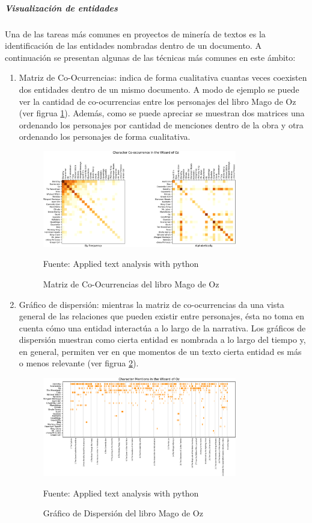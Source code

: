 \subparagraph{Visualización  de entidades}
\subparagraph*{}
    Una de las tareas más comunes en proyectos de minería de textos es la identificación de las entidades nombradas dentro de un documento. A continuación se presentan algunas de las técnicas más comunes en este ámbito:
\begin{enumerate}
    \item Matriz de Co-Ocurrencias: indica de forma cualitativa cuantas veces coexisten dos entidades dentro de un mismo documento. A modo de ejemplo se puede ver la cantidad de co-ocurrencias entre los personajes del libro Mago de Oz (ver figrua \ref{fig:MatrizCoOcurrencias}). Además, como se puede apreciar se muestran dos matrices una ordenando los personajes por cantidad de menciones dentro de la obra y otra ordenando los personajes de forma cualitativa.  
    \begin{figure}[H]
        \centering
        \includegraphics[width=0.8\textwidth]{figures/MatrizCoOcurrencias.png}
        \caption{\label{fig:MatrizCoOcurrencias} Matriz de Co-Ocurrencias del libro Mago de Oz} Fuente: Applied text analysis with python \cite{bengfort2018applied}
    \end{figure}
    \item Gráfico de dispersión: mientras la matriz de co-ocurrencias da una vista general de las relaciones que pueden existir entre personajes, ésta no toma en cuenta cómo una entidad interactúa a lo largo de la narrativa. Los gráficos de dispersión muestran como cierta entidad es nombrada a lo largo del tiempo y, en general, permiten ver en que momentos de un texto cierta entidad es más o menos relevante (ver figrua \ref{fig:DispersionPLot}).
    \begin{figure}[H]
        \centering
        \includegraphics[width=0.8\textwidth]{figures/DispersionPlot.png}
        \caption{\label{fig:DispersionPLot} Gráfico de Dispersión del libro Mago de Oz} Fuente: Applied text analysis with python \cite{bengfort2018applied}
    \end{figure}
\end{enumerate}

